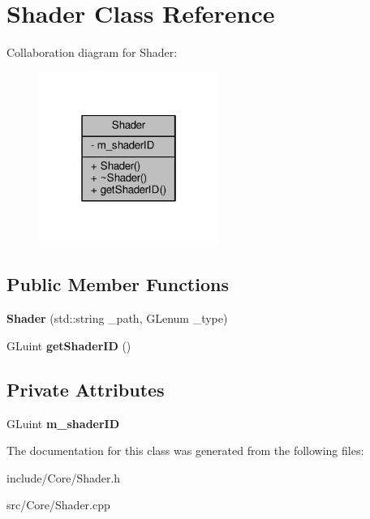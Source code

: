 \hypertarget{class_shader}{\section{Shader Class Reference}
\label{class_shader}
}


Collaboration diagram for Shader\-:
\nopagebreak
\begin{figure}[H]
\begin{center}
\leavevmode
\includegraphics[width=166pt]{class_shader__coll__graph}
\end{center}
\end{figure}
\subsection*{Public Member Functions}
\begin{DoxyCompactItemize}
\item 
\hypertarget{class_shader_ae973667b5383636897d8016ae15a5302}{{\bfseries Shader} (std\-::string \-\_\-path, G\-Lenum \-\_\-type)}\label{class_shader_ae973667b5383636897d8016ae15a5302}

\item 
\hypertarget{class_shader_ad0830d19bbdfafd2162af96008a039fb}{G\-Luint {\bfseries get\-Shader\-I\-D} ()}\label{class_shader_ad0830d19bbdfafd2162af96008a039fb}

\end{DoxyCompactItemize}
\subsection*{Private Attributes}
\begin{DoxyCompactItemize}
\item 
\hypertarget{class_shader_aaa52026dcc3cb96ac62ec62141732f31}{G\-Luint {\bfseries m\-\_\-shader\-I\-D}}\label{class_shader_aaa52026dcc3cb96ac62ec62141732f31}

\end{DoxyCompactItemize}


The documentation for this class was generated from the following files\-:\begin{DoxyCompactItemize}
\item 
include/\-Core/Shader.\-h\item 
src/\-Core/Shader.\-cpp\end{DoxyCompactItemize}
